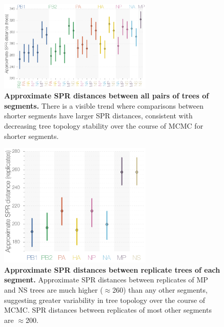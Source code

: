 \documentclass[11pt,oneside,letterpaper]{article}
\begin{document}
\begin{figure}
\centering  
\includegraphics[width=0.65\textwidth]  {supp_figures/InfB_supp_aSPRdistances_trees.png}
\caption{\textbf{Approximate SPR distances between all pairs of trees of segments.}
There is a visible trend where comparisons between shorter segments have larger SPR distances, consistent with decreasing tree topology stability over the course of MCMC for shorter segments.}
\label{SPRdistancesTrees}
\end{figure}

\begin{figure}
\centering  
\includegraphics[width=0.65\textwidth]  {supp_figures/InfB_supp_aSPRdistances_replicates.png}
\caption{\textbf{Approximate SPR distances between replicate trees of each segment.}
Approximate SPR distances between replicates of MP and NS trees are much higher ($\approx$260) than any other segments, suggesting greater variability in tree topology over the course of MCMC.
SPR distances between replicates of most other segments are $\approx$200.
}
\label{SPRdistancesReplicates}
\end{figure}
\end{document}
